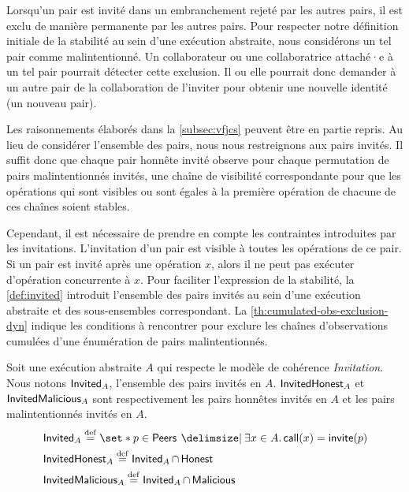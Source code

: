 Lorsqu'un pair est invité dans un embranchement rejeté par les autres pairs, il est exclu de manière permanente par les autres pairs.
Pour respecter notre définition initiale de la stabilité au sein d'une exécution abstraite, nous considérons un tel pair comme malintentionné.
Un collaborateur ou une collaboratrice attaché·e à un tel pair pourrait détecter cette exclusion.
Il ou elle pourrait donc demander à un autre pair de la collaboration de l'inviter pour obtenir une nouvelle identité (un nouveau pair).

Les raisonnements élaborés dans la \autoref{subsec:vfjcs} peuvent être en partie repris.
Au lieu de considérer l'ensemble des pairs, nous nous restreignons aux pairs invités.
Il suffit donc que chaque pair honnête invité observe pour chaque permutation de pairs malintentionnés invités, une chaîne de visibilité correspondante pour que les opérations qui sont visibles ou sont égales à la première opération de chacune de ces chaînes soient stables.


Cependant, il est nécessaire de prendre en compte les contraintes introduites par les invitations.
L'invitation d'un pair est visible à toutes les opérations de ce pair.
Si un pair est invité après une opération $x$, alors il ne peut pas exécuter d'opération concurrente à $x$.
Pour faciliter l'expression de la stabilité, la \autoref{def:invited} introduit l'ensemble des pairs invités au sein d'une exécution abstraite et des sous-ensembles correspondant.
La \autoref{th:cumulated-obs-exclusion-dyn} indique les conditions à rencontrer pour exclure les chaînes d'observations cumulées d'une énumération de pairs malintentionnés.

\clearpage

\begin{definition}[Invités]\label{def:invited}
Soit une exécution abstraite $A$ qui respecte le modèle de cohérence \emph{Invitation}.
Nous notons $\operatorname{\mathsf{Invited}}_A$, l'ensemble des pairs invités en $A$.
$\operatorname{\mathsf{InvitedHonest}}_A$ et $\operatorname{\mathsf{InvitedMalicious}}_A$ sont respectivement les pairs honnêtes invités en $A$ et les pairs malintentionnés invités en $A$.
\begin{align*}
&\trm{Invited}_A \defeq \set*{p \in \trm{Peers} \given \exists x \in A \qsep \trm{call}(x) = \trm{invite}(p)}\\
&\trm{InvitedHonest}_A \defeq \trm{Invited}_A \cap \trm{Honest}\\
&\trm{InvitedMalicious}_A \defeq \trm{Invited}_A \cap \trm{Malicious}
\end{align*}
\end{definition}


